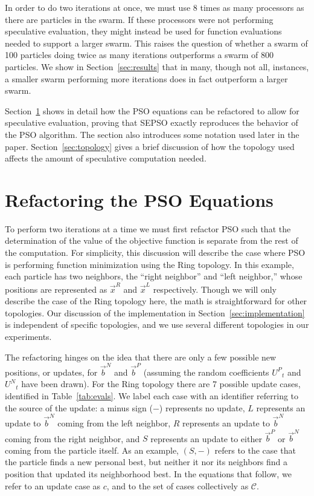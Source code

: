 \documentclass[ms,electronic,twosidetoc,letterpaper,chaptercenter,parttop,equalmargins]{byumsphd}
\renewcommand{\sec}[1]{Section~\ref{sec:#1}}
\providecommand{\pers}{\ensuremath{P}}
\providecommand{\neigh}{\ensuremath{N}}
\providecommand{\leftind}{\ensuremath{L}}
\providecommand{\rightind}{\ensuremath{R}}
\providecommand{\nURand}{\ensuremath{U^\neigh}}
\providecommand{\pURand}{\ensuremath{U^\pers}}
\providecommand{\nbest}{\ensuremath{\Vec{b}^\neigh}}
\providecommand{\pbest}{\ensuremath{\Vec{b}^\pers}}
\providecommand{\leftn}{\ensuremath{\Vec{x}^\leftind}}
\providecommand{\rightn}{\ensuremath{\Vec{x}^\rightind}}
\providecommand{\caseset}{\ensuremath{\mathcal{C}}}
\providecommand{\casegen}{\ensuremath{c}}
\providecommand{\casexn}{\ensuremath{(S,-)}}
\begin{document}
In order to do two iterations at once, we must use 8 times as many processors
as there are particles in the swarm.  If these processors were not performing
speculative evaluation, they might instead be used for function evaluations
needed to support a larger swarm.  This raises the question of whether a swarm
of 100 particles doing twice as many iterations outperforms a swarm of 800
particles.  We show in \sec{results} that in many, though not all, instances, a
smaller swarm performing more iterations does in fact outperform a larger
swarm.

\sec{proof} shows in detail how the PSO equations can be refactored to allow
for speculative evaluation, proving that SEPSO exactly reproduces the behavior
of the PSO algorithm.  The section also introduces some notation used later in
the paper.  \sec{topology} gives a brief discussion of how the topology used
affects the amount of speculative computation needed.

\section{Refactoring the PSO Equations}
\label{sec:proof}

To perform two iterations at a time we must first refactor PSO such that the
determination of the value of the objective function is separate from the rest
of the computation.  For simplicity, this discussion will describe the case
where PSO is performing function minimization using the Ring topology.  In this
example, each particle has two neighbors, the ``right neighbor'' and ``left
neighbor,'' whose positions are represented as $\rightn$ and $\leftn$
respectively.  Though we will only describe the case of the Ring topology here,
the math is straightforward for other topologies.  Our discussion of the
implementation in \sec{implementation} is independent of specific topologies,
and we use several different topologies in our experiments.

The refactoring hinges on the idea that there are only a few possible new
positions, or updates, for $\nbest$ and $\pbest$ (assuming the random
coefficients $\pURand_{t}$ and $\nURand_{t}$ have been drawn).  For the Ring
topology there are 7 possible update cases, identified in
Table~\ref{tab:evals}.  We label each case with an identifier referring to the
source of the update: a minus sign ($-$) represents no update, $L$ represents
an update to $\nbest$ coming from the left neighbor, $R$ represents an update
to $\nbest$ coming from the right neighbor, and $S$ represents an update to
either $\pbest$ or $\nbest$ coming from the particle itself.  As an example,
$\casexn$ refers to the case that the particle finds a new personal best, but
neither it nor its neighbors find a position that updated its neighborhood
best.  In the equations that follow, we refer to an update case as $\casegen$,
and to the set of cases collectively as $\caseset$.
\end{document}

